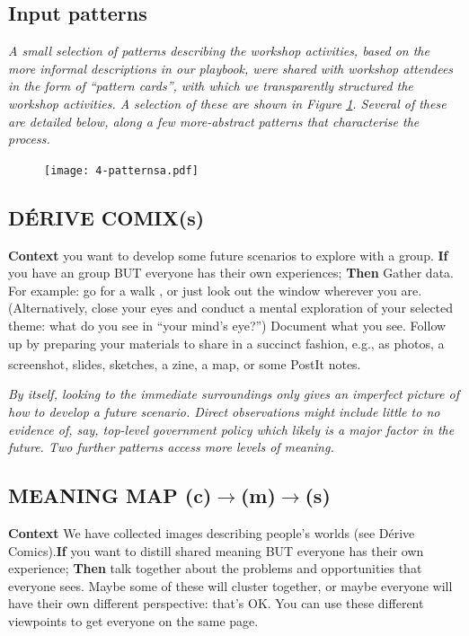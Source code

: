 \documentclass[acmlarge,timestamp]{acmart}
\begin{document}
\subsection{Input patterns} \label{case1-inputs}

\emph{A small selection of patterns describing the workshop
activities, based on the more informal descriptions in our playbook,
were shared with workshop attendees in the form of “pattern cards”,
with which we transparently structured the workshop activities.  A
selection of these are shown in Figure \ref{cards}.  Several of these
are detailed below, along a few more-abstract patterns that
characterise the process.}

\begin{figure}
  \texttt{[image: 4-patternsa.pdf]}
\caption{\label{cards}}
\end{figure}

\subsection*{DÉRIVE COMIX{\hfill (s)}}

\textbf{Context} you want to develop some future scenarios to explore with a group.\newline
\textbf{If} you have an group BUT everyone has their own experiences;\newline
\textbf{Then} Gather data.  For example: go for a walk \cite{debord},  or just look out the window wherever you are.  (Alternatively, close your eyes and conduct a mental exploration of your selected theme: what do you see in “your mind’s eye?”) Document what you see.  Follow up by preparing your materials to share in a succinct fashion, e.g., as photos, a screenshot, slides, sketches, a zine, a map, or some PostIt\textsuperscript{\textregistered} notes.

\smallskip
\noindent \emph{By itself, looking to the immediate surroundings only
gives an imperfect picture of how to develop a future scenario.
Direct observations might include little to no evidence of, say,
top-level government policy which likely is a major factor in the
future.  Two further patterns access more levels of meaning.}

\subsection*{MEANING MAP {\hfill (c)$\rightarrow$(m)$\rightarrow$(s)}}

\textbf{Context} We have collected images describing people’s worlds
(see {\sc Dérive Comics}).\newline \textbf{If} you want to distill
shared meaning BUT everyone has their own experience;\newline
\textbf{Then} talk together about the problems and opportunities that
everyone sees.  Maybe some of these will cluster together, or maybe
everyone will have their own different perspective: that’s OK.  You
can use these different viewpoints to get everyone on the same
page.\newline\smallskip
\end{document}

